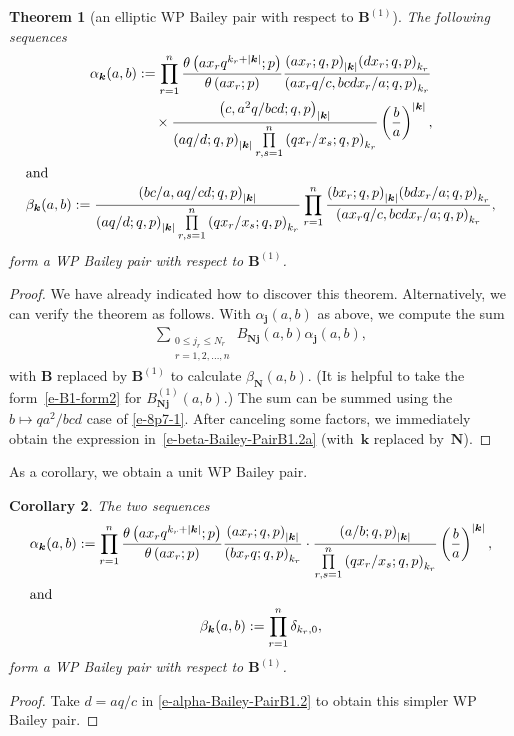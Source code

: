 \documentclass[pdftex]{sigma}
\numberwithin{equation}{section}
\newtheorem{Theorem}{Theorem}[section]
\newtheorem{Corollary}[Theorem]{Corollary}
\newcommand\sumk{{\left| \boldsymbol{k} \right|}}
\newcommand{\B}{{ \mathbf B}}
\newcommand{\N}{{ \boldsymbol N}}
\renewcommand{\k}{{ \boldsymbol{k}}}
\renewcommand{\j}{{ \boldsymbol{j}}}
\newcommand{\multsum}[3]{{\sum\limits_{\substack{{0\le #1_#3 \le #2_#3} \\
{#3 =1,2,\dots, n}}}}}
\newcommand{\sqprod}[1]{\prod\limits_{r, s =1}^{#1}} %
\newcommand{\smallprod}[1]{\prod\limits_{r =1}^{#1}} %
\newcommand{\xover}[1]{#1_{r}/#1_{s}}
\newcommand{\ellipticqrfac}[2]{{\left({#1}; q, p\right)_{#2}}} %
\newcommand{\elliptictheta}[1]{\theta \left({#1} ; p\right) }
\begin{document}
\begin{Theorem}[an elliptic WP Bailey pair with respect to $\B^{(1)}$]\label{th:e-Bailey-Pair-B1.2a}
The following sequences
\begin{subequations}\label{e-alpha-Bailey-PairB1.2}
\begin{gather}
\alpha_\k(a,b) :=
\smallprod n \frac{\elliptictheta{ax_rq^{k_r+\sumk}}}{\elliptictheta{ax_r}}
\frac{\ellipticqrfac{ax_r}{\sumk} \ellipticqrfac{dx_r}{k_r}}
{\ellipticqrfac{ax_rq/c, bcdx_r/a }{k_r} }\notag\\
\hphantom{\alpha_\k(a,b) :=}{}
\times
\frac{\ellipticqrfac{c, a^2q/bcd}{\sumk} }{\ellipticqrfac{aq/d}{\sumk}
\sqprod n \ellipticqrfac{q\xover x}{k_r}}
 \left( \frac{b}{a}\right)^{\sumk}, \label{e-alpha-Bailey-PairB1.2a} \\ \intertext{and}
\beta_\k(a,b) :=
\frac{\ellipticqrfac{bc/a, aq/cd}{\sumk}}{\ellipticqrfac{aq/d}{\sumk}
\sqprod n\ellipticqrfac{q\xover x}{k_r}}
\smallprod n \frac{\ellipticqrfac{bx_r}{\sumk}\ellipticqrfac{bdx_r/a}{k_r}}
{\ellipticqrfac{ax_rq/c, bcdx_r/a}{k_r}} ,
\label{e-beta-Bailey-PairB1.2a}
\end{gather}
\end{subequations}
form a WP Bailey pair with respect to $\B^{(1)}$.
\end{Theorem}
\begin{proof} We have already indicated how to discover this theorem. Alternatively, we can verify the theorem as follows. With $\alpha_\j(a,b)$ as above, we compute the sum
\begin{gather}\label{BP-general}
\multsum{j}{N}{r} B_{\N\j}(a, b) \alpha_\j(a,b) ,
\end{gather}
with $\B$ replaced by $\B^{(1)}$ to calculate $\beta_\N(a,b)$. (It is helpful to take the form~\eqref{e-B1-form2} for $B^{(1)}_{\N\j}(a,b)$.) The sum can be summed using the $b\mapsto qa^2/bcd$ case of \eqref{e-8p7-1}. After canceling some factors, we immediately obtain the expression in~\eqref{e-beta-Bailey-PairB1.2a} (with~$\k$ replaced by~$\N$).
\end{proof}

As a corollary, we obtain a unit WP Bailey pair.
\begin{Corollary}\label{e-Bailey-Pair-B1.1} The two sequences
\begin{gather*}
\alpha_\k(a,b) :=
\smallprod n \frac{\elliptictheta{ax_rq^{k_r+\sumk}}}{\elliptictheta{ax_r}}
\frac{\ellipticqrfac{ax_r}{\sumk}}
{\ellipticqrfac{ bx_rq }{k_r} } \cdot
\frac{\ellipticqrfac{ a/b}{\sumk} }{ \sqprod n\ellipticqrfac{q\xover x}{k_r}} \left( \frac{b}{a}\right)^{\sumk},\\
\intertext{and}
\beta_\k(a,b) := \smallprod n \delta_{k_r, 0},
\end{gather*}
form a WP Bailey pair with respect to $\B^{(1)}$.
\end{Corollary}
\begin{proof} Take $d=aq/c$ in \eqref{e-alpha-Bailey-PairB1.2} to obtain this simpler WP Bailey pair.
\end{proof}
\end{document}

